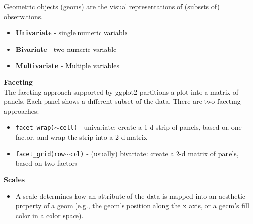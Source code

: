 \documentclass{beamer}
\begin{document}
\begin{frame}
	\Large
	Geometric objects (geoms) are the visual representations of (subsets of) observations.
\begin{itemize}
	\item \textbf{Univariate} - single numeric variable
	\item \textbf{Bivariate} - two numeric variable
	\item \textbf{Multivariate} - Multiple variables
\end{itemize}
\end{frame}
\begin{frame}
\Large
\noindent \textbf{Faceting}\\
	The faceting approach supported by ggplot2 partitions a plot into a matrix of panels. Each panel shows a different subset of the data.
	 There are two faceting approaches:
	
	\begin{itemize}
	\item \texttt{facet\_wrap($\sim$cell)} - univariate: create a 1-d strip of panels, based on one factor, and wrap the strip into a 2-d matrix
	\item \texttt{facet\_grid(row$\sim$col)} - (usually) bivariate: create a 2-d matrix of panels, based on two factors
	\end{itemize}
\end{frame}
\begin{frame}
	\Large
	\noindent \textbf{Scales}
	\begin{itemize}
\item A scale determines how an attribute of the data is mapped into an aesthetic property of a geom (e.g., the geom's position along the x axis, or a geom's fill color in a color space).
	\end{itemize}

\end{frame}
\end{document}
